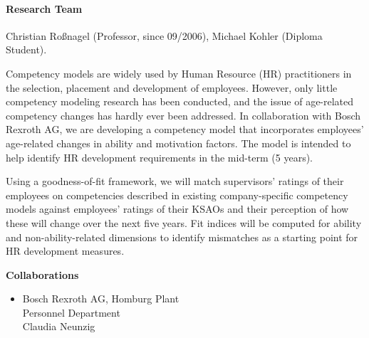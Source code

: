 \enlargethispage*{1cm}


\paragraph{Research Team}
Christian Ro\ss nagel (Professor, since 09/2006), Michael Kohler (Diploma Student).

 Competency models are widely used by Human Resource (HR) practitioners in the selection, placement and development of employees. However, only little competency modeling research has been conducted, and the issue of age-related competency changes has hardly ever been addressed. In collaboration with Bosch Rexroth AG, we are developing a competency model that incorporates employees' age-related changes in ability and motivation factors. The model is intended to help identify HR development requirements in the mid-term (5 years).

 Using a goodness-of-fit framework, we will match supervisors' ratings of their employees on competencies described in existing company-specific competency models against employees' ratings of their KSAOs and their perception of how these will change over the next five years. Fit indices will be computed for ability and non-ability-related dimensions to identify mismatches as a starting point for HR development measures.

\textbf{Collaborations}
\begin{itemize}
\item Bosch Rexroth AG, Homburg Plant \\ Personnel Department \\ Claudia Neunzig
\end{itemize}
